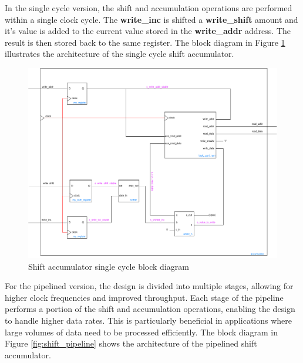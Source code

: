 \documentclass[a4paper,12pt]{article}
\begin{document}
In the single cycle version, the shift and accumulation operations are performed within a single clock cycle. The \textbf{write\_inc} is shifted a \textbf{write\_shift} amount and it's value is added to the current value stored in the \textbf{write\_addr} address. The result is then stored back to the same register.
The block diagram in Figure \ref{fig:shift} illustrates the architecture of the single cycle shift accumulator.

\begin{figure}[H]
    \centering
    \includegraphics[width=1.0\linewidth]{accumulator_shift_single_cycle.png}
    \caption{Shift accumulator single cycle block diagram}
    \label{fig:shift}
\end{figure}

For the pipelined version, the design is divided into multiple stages, allowing for higher clock frequencies and improved throughput. Each stage of the pipeline performs a portion of the shift and accumulation operations, enabling the design to handle higher data rates. This is particularly beneficial in applications where large volumes of data need to be processed efficiently. The block diagram in Figure \ref{fig:shift_pipeline} shows the architecture of the pipelined shift accumulator.
\end{document}
